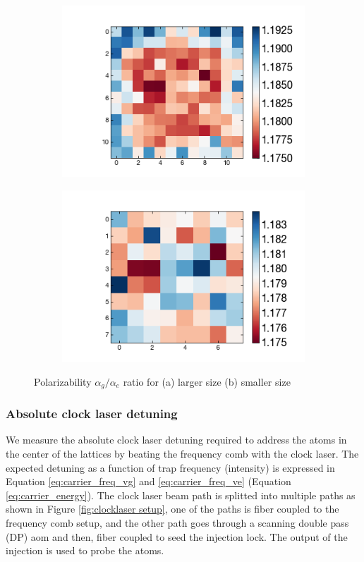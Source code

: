 		\begin{figure}
		\hspace*{-2cm}
		\begin{subfigure}{0.4\linewidth}
			\includegraphics[scale=0.7]{figures/pol_ratio_size6.png}
		\end{subfigure}
		\qquad\qquad\qquad\quad
		\begin{subfigure}{0.4\linewidth}
			\includegraphics[scale=0.7]{figures/pol_ratio_size4.png}
		\end{subfigure}
		\caption{Polarizability $\alpha_g/\alpha_e$ ratio for (a) larger size (b) smaller size} 
		\label{fig:pol_ratio}
		\end{figure}


	\subsubsection{Absolute clock laser detuning}\label{subsection:comb}
			We measure the absolute clock laser detuning required to address the atoms in the center of the lattices by beating the frequency comb with the clock laser. The expected detuning as a function of trap frequency (intensity) is expressed in Equation \ref{eq:carrier_freq_vg} and \ref{eq:carrier_freq_ve} (Equation \ref{eq:carrier_energy}). The clock laser beam path is splitted into multiple paths as shown in Figure \ref{fig:clocklaser setup}, one of the paths is fiber coupled to the frequency comb setup, and the other path goes through a scanning double pass (DP) aom and then, fiber coupled to seed the injection lock. The output of the injection is used to probe the atoms.

